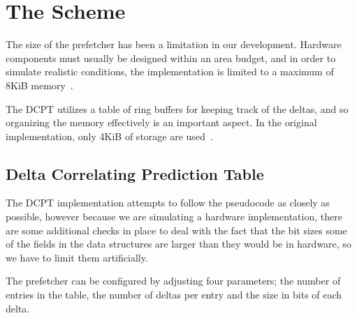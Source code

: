 \section{The Scheme}


The size of the prefetcher has been a limitation in our development. Hardware
components must usually be designed within an area budget, and in order to
simulate realistic conditions, the implementation is limited to a maximum of
8KiB memory~\cite{guidelines}.



The DCPT utilizes a table of ring buffers for keeping track of the deltas, and
so organizing the memory effectively is an important aspect. In the original
implementation, only 4KiB of storage are used~\cite{dcpt}.


\subsection{Delta Correlating Prediction Table}

The DCPT implementation attempts to follow the pseudocode as closely as possible,
however because we are simulating a hardware implementation, there are some additional
checks in place to deal with the fact that the bit sizes some of the fields in the
data structures are larger than they would be in hardware, so we have to limit them
artificially.

The prefetcher can be configured by adjusting four parameters; the number of entries
in the table, the number of deltas per entry and the size in bits of each delta.

